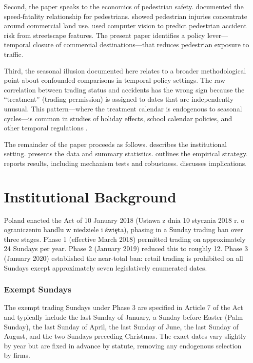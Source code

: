 \documentclass[12pt]{article}
\begin{document}
Second, the paper speaks to the economics of pedestrian safety. \citet{tefft2013impact} documented the speed-fatality relationship for pedestrians. \citet{dimaggio2014spatiotemporal} showed pedestrian injuries concentrate around commercial land use. \citet{naik2019safe} used computer vision to predict pedestrian accident risk from streetscape features. The present paper identifies a policy lever---temporal closure of commercial destinations---that reduces pedestrian exposure to traffic.

Third, the seasonal illusion documented here relates to a broader methodological point about confounded comparisons in temporal policy settings. The raw correlation between trading status and accidents has the wrong sign because the ``treatment'' (trading permission) is assigned to dates that are independently unusual. This pattern---where the treatment calendar is endogenous to seasonal cycles---is common in studies of holiday effects, school calendar policies, and other temporal regulations \citep{dahl2009peer, heathcote2018consumption}.

The remainder of the paper proceeds as follows.  describes the institutional setting.  presents the data and summary statistics.  outlines the empirical strategy.  reports results, including mechanism tests and robustness.  discusses implications.


\section{Institutional Background}
\label{sec:background}

Poland enacted the Act of 10 January 2018 (Ustawa z dnia 10 stycznia 2018 r. o ograniczeniu handlu w niedziele i \'{s}wi\c{e}ta), phasing in a Sunday trading ban over three stages. Phase 1 (effective March 2018) permitted trading on approximately 24 Sundays per year. Phase 2 (January 2019) reduced this to roughly 12. Phase 3 (January 2020) established the near-total ban: retail trading is prohibited on all Sundays except approximately seven legislatively enumerated dates.

\subsubsection*{Exempt Sundays} The exempt trading Sundays under Phase 3 are specified in Article 7 of the Act and typically include the last Sunday of January, a Sunday before Easter (Palm Sunday), the last Sunday of April, the last Sunday of June, the last Sunday of August, and the two Sundays preceding Christmas. The exact dates vary slightly by year but are fixed in advance by statute, removing any endogenous selection by firms.
\end{document}
